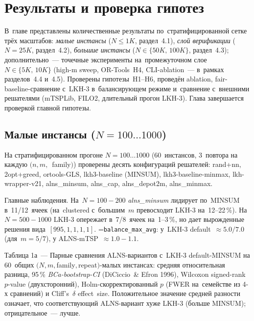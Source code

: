 \documentclass[a4paper,14pt]{extreport}
\makeatletter
\let\old@texttt\texttt
\renewcommand{\texttt}[1]{{\sloppy\hyphenchar\font=\m@ne\old@texttt{#1}}}
\makeatother
\begin{document}
\chapter{Результаты и проверка гипотез}

В~главе представлены количественные результаты по~стратифицированной сетке трёх масштабов: \emph{малые инстансы} ($N\leq 1K$, раздел~4.1), \emph{слой верификации} ($N=25K$, раздел~4.2), \emph{большие инстансы} ($N\in\{50K,\,100K\}$, раздел~4.3); дополнительно~--- точечные эксперименты на~промежуточном слое $N\in\{5K,\,10K\}$ (high-m sweep, OR-Tools~H4, CLI-ablation~--- в~рамках разделов~4.4 и~4.5). Проверены гипотезы~H1--H6, проведён ablation, fair-baseline-сравнение с~LKH-3 в~балансирующем режиме и~сравнение с~внешними решателями (mTSPLib, FILO2, длительный прогон LKH-3). Глава завершается проверкой главной гипотезы.

\section{Малые инстансы ($N = 100\dots1000$)}

На стратифицированном прогоне $N = 100\dots1000$ (60~инстансов, 3~повтора на каждую $(n, m,$~family$)$) проверены десять конфигураций решателей: rand+nn, 2opt+greed, ortools-GLS, lkh3-baseline (MINSUM), lkh3-baseline-minmax, lkh-wrapper-v21, alns\_minsum, alns\_cap, alns\_depot2m, alns\_minmax.

Главные наблюдения. На~$N=100{-}200$ \emph{alns\_minsum} лидирует по~MINSUM в~11/12~ячеек (на~clustered с~большим~$m$ превосходит LKH-3 на~12--22\,\%). На~$N=500{-}1000$ LKH-3 опережает в~7/8~ячеек на~1--3\,\%, но дает вырожденные решения вида~$[995,1,1,1,1]$. \texttt{balance\_max\_avg}: у~LKH-3 default~$\approx 5.0/7.0$ (для~$m=5/7$), у ALNS-mTSP~$\approx 1.0{-}1.1$.

\medskip
\noindent Таблица 1а~--- Парные сравнения ALNS-вариантов с~LKH-3 default-MINSUM на 60~общих $(N, m,$family$,$repeat$)$-малых инстансах: средняя относительная разница, 95\,\% \emph{BCa-bootstrap-CI} (DiCiccio~\& Efron 1996), Wilcoxon signed-rank $p$-value (двухсторонний), Holm-скорректированный $p$ (FWER на~семействе из 4-х сравнений) и Cliff's~$\delta$ effect~size. Положительное значение средней разности означает, что соответствующий ALNS-вариант хуже LKH-3 (больше MINSUM); отрицательное~--- лучше.
\end{document}
